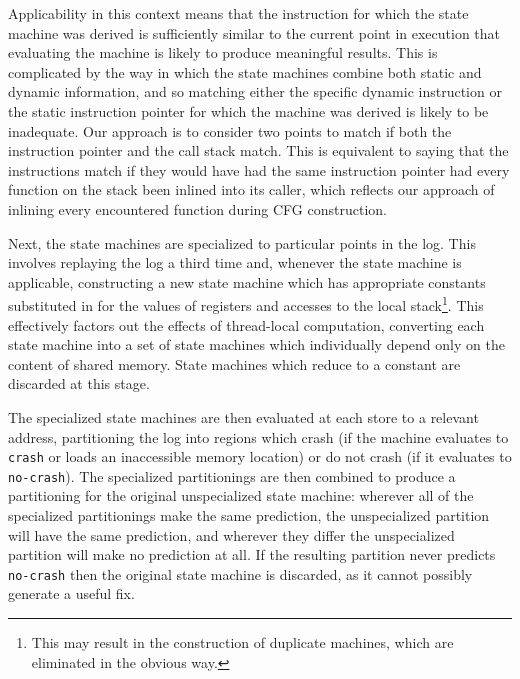 \documentclass[10pt,twocolumn,preprint,natbib,authoryear]{sigplanconf}
\newcommand{\editorial}[1]{}
\begin{document}
Applicability in this context means that the instruction for which the
state machine was derived is sufficiently similar to the current point
in execution that evaluating the machine is likely to produce
meaningful results.  This is complicated by the way in which the state
machines combine both static and dynamic information, and so matching
either the specific dynamic instruction or the static instruction
pointer for which the machine was derived is likely to be inadequate.
Our approach is to consider two points to match if both the
instruction pointer and the call stack match.  This is equivalent to
saying that the instructions match if they would have had the same
instruction pointer had every function on the stack been inlined into
its caller, which reflects our approach of inlining every encountered
function during CFG construction.

Next, the state machines are specialized to particular points in the
log.  This involves replaying the log a third time and, whenever the
state machine is applicable, constructing a new state machine which
has appropriate constants substituted in for the values of registers
and accesses to the local stack\footnote{This may result in the
  construction of duplicate machines, which are eliminated in the
  obvious way.}.  This effectively factors out the effects of
thread-local computation, converting each state machine into a set of
state machines which individually depend only on the content of shared
memory.  State machines which reduce to a constant are discarded at
this stage.

The specialized state machines are then evaluated at each store to a
relevant address, partitioning the log into regions which crash (if
the machine evaluates to \verb|crash| or loads an inaccessible memory
location) or do not crash (if it evaluates to \verb|no-crash|).  The
specialized partitionings are then combined to produce a partitioning
for the original unspecialized state machine: wherever all of the
specialized partitionings make the same prediction, the unspecialized
partition will have the same prediction, and wherever they differ the
unspecialized partition will make no prediction at all.  If the
resulting partition never predicts \verb|no-crash| then the original
state machine is discarded, as it cannot possibly generate a useful
fix.

\end{document}
